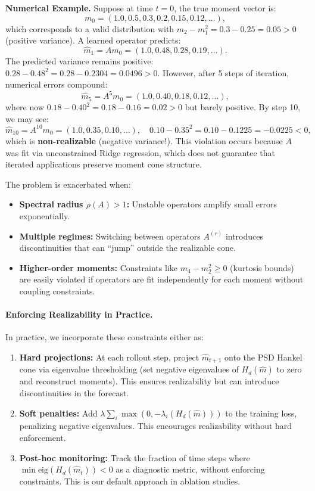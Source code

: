\documentclass[journal, onecolumn]{IEEEtran}
\begin{document}
\textbf{Numerical Example.} Suppose at time $t=0$, the true moment vector is:
\[
m_0 = (1.0, 0.5, 0.3, 0.2, 0.15, 0.12, \dots),
\]
which corresponds to a valid distribution with $m_2 - m_1^2 = 0.3 - 0.25 = 0.05 > 0$ (positive variance). A learned operator predicts:
\[
\hat{m}_1 = A m_0 = (1.0, 0.48, 0.28, 0.19, \dots).
\]
The predicted variance remains positive: $0.28 - 0.48^2 = 0.28 - 0.2304 = 0.0496 > 0$. However, after 5 steps of iteration, numerical errors compound:
\[
\hat{m}_5 = A^5 m_0 = (1.0, 0.40, 0.18, 0.12, \dots),
\]
where now $0.18 - 0.40^2 = 0.18 - 0.16 = 0.02 > 0$ but barely positive. By step 10, we may see:
\[
\hat{m}_{10} = A^{10} m_0 = (1.0, 0.35, 0.10, \dots), \quad 0.10 - 0.35^2 = 0.10 - 0.1225 = -0.0225 < 0,
\]
which is \textbf{non-realizable} (negative variance!). This violation occurs because $A$ was fit via unconstrained Ridge regression, which does not guarantee that iterated applications preserve moment cone structure.

The problem is exacerbated when:
\begin{itemize}
    \item \textbf{Spectral radius $\rho(A) > 1$:} Unstable operators amplify small errors exponentially.
    \item \textbf{Multiple regimes:} Switching between operators $A^{(r)}$ introduces discontinuities that can ``jump'' outside the realizable cone.
    \item \textbf{Higher-order moments:} Constraints like $m_4 - m_2^2 \ge 0$ (kurtosis bounds) are easily violated if operators are fit independently for each moment without coupling constraints.
\end{itemize}

\paragraph{Enforcing Realizability in Practice.}
In practice, we incorporate these constraints either as:
\begin{enumerate}
    \item \textbf{Hard projections:} At each rollout step, project $\hat{m}_{t+1}$ onto the PSD Hankel cone via eigenvalue thresholding (set negative eigenvalues of $H_d(\hat{m})$ to zero and reconstruct moments). This ensures realizability but can introduce discontinuities in the forecast.
    \item \textbf{Soft penalties:} Add $\lambda \sum_i \max(0, -\lambda_i(H_d(\hat{m})))$ to the training loss, penalizing negative eigenvalues. This encourages realizability without hard enforcement.
    \item \textbf{Post-hoc monitoring:} Track the fraction of time steps where $\min \text{eig}(H_d(\hat{m}_t)) < 0$ as a diagnostic metric, without enforcing constraints. This is our default approach in ablation studies.
\end{enumerate}
\end{document}
